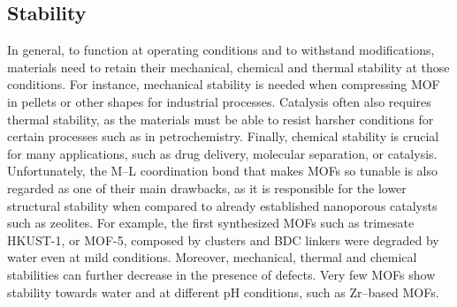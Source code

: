 \subsection*{Stability}
In general, to function at operating conditions and to withstand modifications, materials need to retain their mechanical, chemical and thermal stability at those conditions. For instance, mechanical stability is needed when compressing MOF in pellets or other shapes for industrial processes\cite{chapman2009pressure}. Catalysis often also requires thermal stability, as the materials must be able to resist harsher conditions for certain processes such as in petrochemistry. Finally, chemical stability is crucial for many applications, such as drug delivery, molecular separation, or catalysis\cite{horcajada2010porous}. 
\npar
Unfortunately, the M--L coordination bond that makes MOFs so tunable is also regarded as one of their main drawbacks\cite{keskin2010can, canivet2014water, kizzie2011effect}, as it is responsible for the lower structural stability when compared to already established nanoporous catalysts such as zeolites. 
For example, the first synthesized MOFs such as  trimesate HKUST-1, or MOF-5, composed by  clusters and BDC linkers were degraded by water even at mild conditions\cite{greathouse2006interaction, low2009virtual, kaye2007impact, decoste2013effect}. Moreover, mechanical, thermal and chemical stabilities can further decrease in the presence of defects. Very few MOFs show stability towards water and at different pH conditions\cite{leus2016systematic}, such as Zr--based MOFs. 

